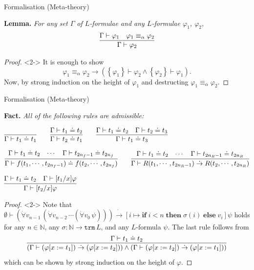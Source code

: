 \documentclass[serif,table,10pt]{beamer}
\newcommand{\IN}{\mathbb{N}}
\newcommand{\0}{\texttt{0}}
\newcommand{\1}{\texttt{1}}
\newcommand{\Leq}{\mathrel{\dot{=}}}
\newcommand{\Lto}{\mathrel{\dot{\to}}}
\newcommand{\Lall}[1]{\dot{\forall}#1\,}
\begin{document}
\begin{frame}{Formalisation (Meta-theory)}

    \textbf{Lemma.}
    \emph{For any set $\Gamma$ of $L$-formulae and any $L$-formulae $\varphi_1$, $\varphi_2$, $$ \infer{\Gamma \vdash \varphi_2}{\Gamma \vdash \varphi_1 & \varphi_1 \equiv_\alpha \varphi_2} $$}

    \begin{proof}<2->
        It is enough to show $$ \varphi_1 \equiv_\alpha \varphi_2 \to ( \left\{ \varphi_1 \right\} \vdash \varphi_2 \land \left\{ \varphi_2 \right\} \vdash \varphi_1 ) . $$
        Now, by strong induction on the height of $\varphi_1$ and destructing $ \varphi_1 \equiv_\alpha \varphi_2 $.
    \end{proof}

\end{frame}

\begin{frame}{Formalisation (Meta-theory)}

    \textbf{Fact.}
    \emph{All of the following rules are admissible:}

    \begin{center} \small
        $ \infer{\Gamma \vdash t_1 \Leq t_1}{} \qquad \infer{\Gamma \vdash t_2 \Leq t_1}{\Gamma \vdash t_1 \Leq t_2} \qquad \infer{\Gamma \vdash t_1 \Leq t_3}{\Gamma \vdash t_1 \Leq t_2 & \Gamma \vdash t_2 \Leq t_3} $
    \end{center}
    \begin{center} \small
        $ \infer{\Gamma \vdash f (t_1, \cdots , t_{2 n_f - 1}) \Leq f (t_2 , \cdots , t_{2 n_f})}{\Gamma \vdash t_1 \Leq t_2 & \cdots & \Gamma \vdash t_{2 n_f - 1} \Leq t_{2 n_f}} \qquad \infer{\Gamma \vdash R (t_1, \cdots , t_{2 n_R - 1}) \Lto R (t_2 , \cdots , t_{2 n_R})}{\Gamma \vdash t_1 \Leq t_2 & \cdots & \Gamma \vdash t_{2 n_R - 1} \Leq t_{2 n_R}} $
    \end{center}
    \begin{center} \small
        $ \infer{\Gamma \vdash [t_2 / x] \varphi}{\Gamma \vdash t_1 \Leq t_2 & \Gamma \vdash [t_1 / x] \varphi} $
    \end{center}

    \begin{proof}<2-> \small
        Note that $ \emptyset \vdash ( \Lall{v_{n-1}} ( \Lall{v_{n-2}} \cdots ( \Lall{v_0} \psi ) ) ) \Lto [ i \mapsto \mathbf{if} \; i < n \; \mathbf{then} \; \sigma ( i ) \; \mathbf{else} \; v_i ] \psi $ holds for any $n \in \IN$, any $\sigma : \IN \to \mathtt{trm} \, L$, and any $L$-formula $\psi$.
        The last rule follows from \[ \infer{(\Gamma \vdash (\varphi [ x := t_1 ]) \Lto (\varphi [ x := t_2 ]) ) \land ( \Gamma \vdash (\varphi [ x := t_2 ]) \Lto (\varphi [ x := t_1 ]) )}{\Gamma \vdash t_1 \Leq t_2} \] which can be shown by strong induction on the height of $\varphi$.
    \end{proof}

\end{frame}
\end{document}
